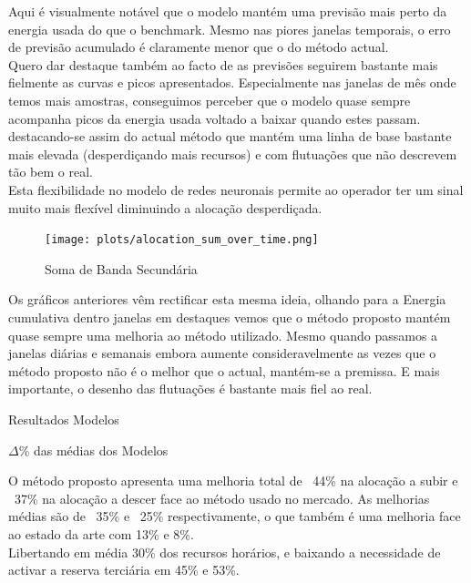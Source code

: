 Aqui é visualmente notável que o modelo mantém uma previsão mais perto da energia usada do que o benchmark. Mesmo nas piores janelas temporais, o erro de previsão acumulado é claramente menor que o do método actual.\\
Quero dar destaque também ao facto de as previsões seguirem bastante mais fielmente as curvas e picos apresentados. Especialmente nas janelas de mês onde temos mais amostras, conseguimos perceber que o modelo quase sempre acompanha picos da energia usada voltado a baixar quando estes passam. destacando-se assim do actual método que mantém uma linha de base bastante mais elevada (desperdiçando mais recursos) e com flutuações que não descrevem tão bem o real. \\
Esta flexibilidade no modelo de redes neuronais permite ao operador ter um sinal muito mais flexível diminuindo a alocação desperdiçada.\\

\begin{figure}[H]
    \centering
    \texttt{[image: plots/alocation\_sum\_over\_time.png]}
    \caption{Soma de Banda Secundária}
    \label{fig:mltimewindowssum}
\end{figure}

Os gráficos anteriores vêm rectificar esta mesma ideia, olhando para a Energia cumulativa dentro janelas em destaques vemos que o método proposto mantém quase sempre uma melhoria ao método utilizado. Mesmo quando passamos a janelas diárias e semanais embora aumente consideravelmente as vezes que o método proposto não é o melhor que o actual, mantém-se a premissa. E mais importante, o desenho das flutuações é bastante mais fiel ao real.\\


\begin{table}[H]
    \caption{Resultados Modelos}    
    \resizebox{\linewidth}{!}{}
    \label{tab:mlres}
    \end{table}



\begin{table}[H]
    \caption{$\Delta$\% das médias dos Modelos}    
    \resizebox{\linewidth}{!}{}
    \label{tab:mlres_deltas}
    \end{table}

O método proposto apresenta uma melhoria total de ~44\% na alocação a subir e ~37\% na alocação a descer face ao método usado no mercado. As melhorias médias são de ~35\% e ~25\% respectivamente, o que também é uma melhoria face ao estado da arte \cite{Algarvio2024} com 13\% e 8\%.\\
Libertando em média 30\% dos recursos horários, e baixando a necessidade de activar a reserva terciária em 45\% e 53\%. \\

